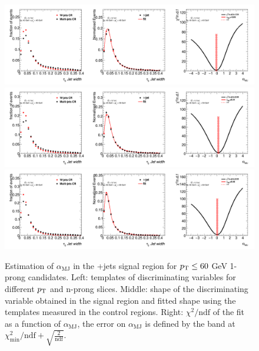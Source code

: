 	\begin{figure}
	\begin{center}
	\includegraphics[width=1\textwidth]{chapters/chapter6_HPlus/images/FFs/FFs_FIT_SR_TAUJET_1_40_45.png}
	\includegraphics[width=1\textwidth]{chapters/chapter6_HPlus/images/FFs/FFs_FIT_SR_TAUJET_1_45_50.png}
	\includegraphics[width=1\textwidth]{chapters/chapter6_HPlus/images/FFs/FFs_FIT_SR_TAUJET_1_50_60.png}

	\end{center}
	\caption{
	Estimation of $\alpha_\mathrm{MJ}$ in the \tauhad+jets signal region for $p_{\text{T}} \leq 60$ GeV 
	1-prong \tauhad candidates. Left: templates of discriminating variables for different \tauhad $p_{\text{T}}$ 
	and n-prong slices. Middle: shape of the discriminating variable obtained in the signal region and fitted 
	shape using the templates measured in the control regions. Right: $\chi^2/\mathrm{ndf}$ of the fit as a 
	function of $\alpha_\mathrm{MJ}$, the error on $\alpha_\mathrm{MJ}$ is defined by the band at 
	$\chi^2_\mathrm{min}/\mathrm{ndf}+\sqrt{\frac{2}{\mathrm{ndf}}}$.
	}

	\label{fig:mm:Fits:region3_1}
	\end{figure}

